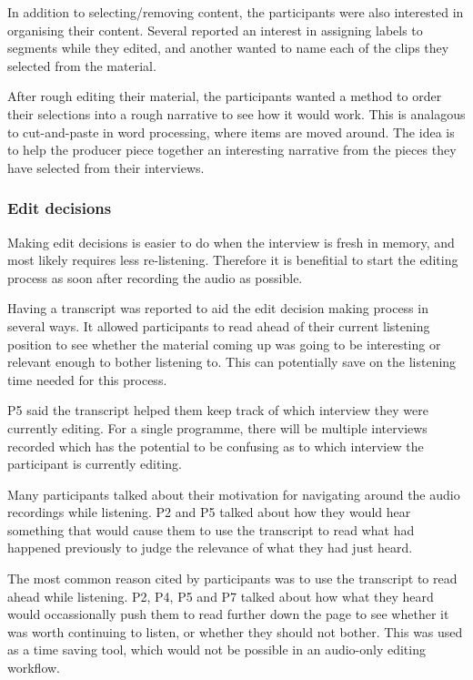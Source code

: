 
In addition to selecting/removing content, the participants were also interested in organising their content. Several
reported an interest in assigning labels to segments while they edited, and another wanted to name each of the clips
they selected from the material.


After rough editing their material, the participants wanted a method to order their selections into a rough narrative
to see how it would work. This is analagous to cut-and-paste in word processing, where items are moved around. The idea
is to help the producer piece together an interesting narrative from the pieces they have selected from their
interviews.

\subsubsection{Edit decisions}


Making edit decisions is easier to do when the interview is fresh in memory, and most likely requires less
re-listening. Therefore it is benefitial to start the editing process as soon after recording the audio as possible.

Having a transcript was reported to aid the edit decision making process in several ways. It allowed participants to
read ahead of their current listening position to see whether the material coming up was going to be interesting or
relevant enough to bother listening to. This can potentially save on the listening time needed for this process.

P5 said the transcript helped them keep track of which interview they were currently editing. For a single programme,
there will be multiple interviews recorded which has the potential to be confusing as to which interview the
participant is currently editing.

Many participants talked about their motivation for navigating around the audio recordings while listening. P2 and P5
talked about how they would hear something that would cause them to use the transcript to read what had happened
previously to judge the relevance of what they had just heard.

The most common reason cited by participants was to use the transcript to read ahead while listening. P2, P4, P5 and P7
talked about how what they heard would occassionally push them to read further down the page to see whether it was
worth continuing to listen, or whether they should not bother. This was used as a time saving tool, which would not be
possible in an audio-only editing workflow.

